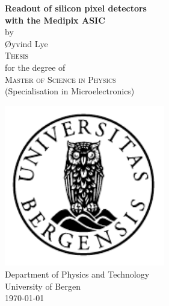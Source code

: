 \documentclass[12pt]{article}
\begin{document}
\maketitle

\newcommand{\blankpage}{\newpage{}\thispagestyle{empty}\mbox{}\newpage{}}
\newcommand{\HRule}{\rule{\linewidth}{0.5mm}}

\begin{titlepage}
\begin{center}
{ \Huge \bfseries Readout of silicon pixel detectors \\with the Medipix ASIC}\\[1cm]

\large by\\ \Large Øyvind Lye\\[1.6cm]

\textsc{\Large Thesis}\\
\large for the degree of\\
\textsc{\Large Master of Science in Physics}\\[0.5cm]
\large (Specialisation in Microelectronics) \\[0.5cm]


\end{center}
\vfill
\begin{center}
{
	\includegraphics[width=7cm]{uib-emblem-svart}\\[0.5cm]
	
	\large Department of Physics and Technology\\
	\large University of Bergen\\[1cm]
	\today}
\end{center}
\end{titlepage}
\end{document}
